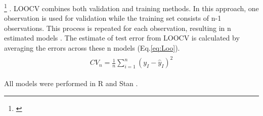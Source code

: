 \documentclass[11pt]{article}
\newcommand{\jacob}[2]{{\color{blue}{#1}}\footnote{\textit{\color{blue}{#2}}}}
\begin{document}
\jacob{To select the best model for each vital rate, we compared the four models using the leave-one-out cross-validation (LOOCV)} {I need to add something about  difference in  models} \citep{vehtari2017practical}. 
LOOCV combines both validation and training methods. 
In this approach, one observation is used for validation while the training set consists of n-1 observations. 
This process is repeated for each observation, resulting in n estimated models \citep{silva2024robust}. 
The estimate of test error from LOOCV is calculated by averaging the errors across these n models (Eq.\ref{eq:Loo}).
\begin{align}\label{eq:Loo}
\begin{split}
CV_{n}=\frac {1}{n} \sum^{n}_{i=1}{(y_{I}-\hat{y}_{I})^2}
\end{split}
\end{align}

All models were performed in R \citep{RCoreTeam} and Stan \citep{Rstan}.
\end{document}
